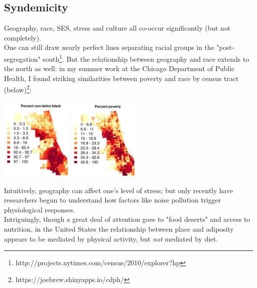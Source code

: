 \documentclass[11pt]{article}
\begin{document}
\begin{multicols}{2}
\subsection*{Syndemicity}
Geography, race, SES, stress and culture all co-occur significantly (but not completely). \\

One can still draw nearly perfect lines separating racial groups in the "post-segregation" south\footnote{http://projects.nytimes.com/census/2010/explorer?hp}.  But the relationship between geography and race extends to the north as well: in my summer work at the Chicago Department of Public Health, I found striking similarities between poverty and race by census tract (below)\footnote{https://joebrew.shinyapps.io/cdph/}:

\begin{center}
\includegraphics[width=3.5cm]{black} \includegraphics[width=3.5cm]{poverty}
\end{center}

Intuitively, geography can affect one's level of stress; but only recently have researchers begun to understand how factors like noise pollution trigger physiological responses.\cite{Chang2014}  \\

Intriguingly, though a great deal of attention goes to "food deserts" and access to nutrition, in the United States the relationship between place and adiposity appears to be mediated by physical activity, but \emph{not} mediated by diet.\cite{vonHippel2014} \\


\end{multicols}
\end{document}

